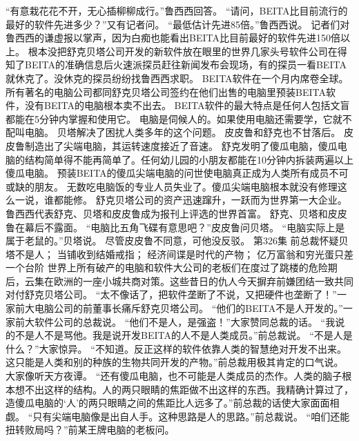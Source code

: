 \documentclass[a4paper,12pt,UTF8,twoside]{ctexbook}
\begin{document}
        “有意栽花花不开，无心插柳柳成行。”鲁西西回答。  
        “请问，BEITA比目前流行的最好的软件先进多少？”又有记者问。  
        “最低估计先进85倍。”鲁西西说。  
        记者们对鲁西西的谦虚报以掌声，因为白痴也能看出BEITA比目前最好的软件先进150倍以上。  
        根本没把舒克贝塔公司开发的新软件放在眼里的世界几家头号软件公司在得知了BEITA的准确信息后火速派探员赶往新闻发布会现场，有的探员一看BEITA就休克了。没休克的探员纷纷找鲁西西求职。  
        BEITA软件在一个月内席卷全球。所有著名的电脑公司都同舒克贝塔公司签约在他们出售的电脑里预装BEITA软件，没有BEITA的电脑根本卖不出去。  
        BEITA软件的最大特点是任何人包括文盲都能在5分钟内掌握和使用它。  
        电脑是伺候人的。如果使用电脑还需要学，它就不配叫电脑。  
        贝塔解决了困扰人类多年的这个问题。  
        皮皮鲁和舒克也不甘落后。  
        皮皮鲁制造出了尖端电脑，其运转速度接近了音速。  
        舒克发明了傻瓜电脑，傻瓜电脑的结构简单得不能再简单了。任何幼儿园的小朋友都能在10分钟内拆装两遍以上傻瓜电脑。  
        预装BEITA的傻瓜尖端电脑的问世使电脑真正成为人类所有成员不可或缺的朋友。  
        无数吃电脑饭的专业人员失业了。傻瓜尖端电脑根本就没有修理这么一说，谁都能修。  
        舒克贝塔公司的资产迅速蹿升，一跃而为世界第一大企业。  
        鲁西西代表舒克、贝塔和皮皮鲁成为报刊上评选的世界首富。  
        舒克、贝塔和皮皮鲁在幕后不露面。  
        “电脑比五角飞碟有意思吧？”皮皮鲁问贝塔。  
        “电脑实际上是属于老鼠的。”贝塔说。  
        尽管皮皮鲁不同意，可他没反驳。          第326集  
        前总裁怀疑贝塔不是人；  
        当铺收到结婚戒指；  
        经济间谍是时代的产物；  
        亿万富翁和穷光蛋只差一个台阶    
        世界上所有破产的电脑和软件大公司的老板们在度过了跳楼的危险期后，云集在欧洲的一座小城共商对策。这些昔日的仇人今天摒弃前嫌团结一致共同对付舒克贝塔公司。  
        “太不像话了，把软件垄断了不说，又把硬件也垄断了！”一家前大电脑公司的前董事长痛斥舒克贝塔公司。  
        “他们的BEITA不是人开发的。”一家前大软件公司的总裁说。  
        “他们不是人，是强盗！”大家赞同总裁的话。  
        “我说的不是人不是骂他。我是说开发BEITA的人不是人类成员。”前总裁说。  
        “不是人是什么？”大家惊异。  
        “不知道。反正这样的软件依靠人类的智慧绝对开发不出来。这只能是人类和别的种族的生物共同开发的产物。”前总裁用极其肯定的口气说。  
        大家像听天方夜谭。  
        “还有傻瓜电脑，也不可能是人类成员的杰作。人类的脑子根本想不出这样的结构。人的两只眼睛的焦距做不出这样的东西。我精确计算过了，造傻瓜电脑的‘人’的两只眼睛之间的焦距比人远多了。”前总裁的话使大家面面相觑。  
        “只有尖端电脑像是出自人手。这种思路是人的思路。”前总裁说。  
        “咱们还能扭转败局吗？”前某王牌电脑的老板问。  
\end{document}
